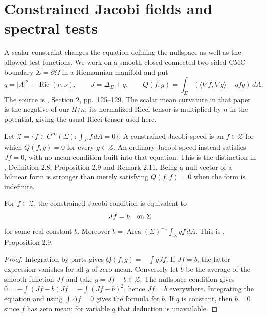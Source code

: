\chapter{Constrained Jacobi fields and spectral tests}\label{sec:cmc-jacobi}
A scalar constraint changes the equation defining the nullspace as well as the allowed test functions. We work on a smooth closed connected two-sided CMC boundary $\Sigma=\partial\Omega$ in a Riemannian manifold and put
\[
 q=|A|^2+\operatorname{Ric}(\nu,\nu),\qquad J=\Delta_\Sigma+q,\qquad
 Q(f,g)=\int_\Sigma(\langle\nabla f,\nabla g\rangle-qfg)\,dA.
\]
The source is \cite{BdCE88}, Section 2, pp.~125--129. The scalar mean curvature in that paper is the negative of our $H/n$; its normalized Ricci tensor is multiplied by $n$ in the potential, giving the usual Ricci tensor used here.

\begin{definition}\label{def:constrained-jacobi-nullspace}
Let $\mathcal Z=\{f\in C^\infty(\Sigma):\int_\Sigma f\,dA=0\}$. A constrained Jacobi speed is an $f\in\mathcal Z$ for which $Q(f,g)=0$ for every $g\in\mathcal Z$. An ordinary Jacobi speed instead satisfies $Jf=0$, with no mean condition built into that equation. This is the distinction in \cite{BdCE88}, Definition 2.8, Proposition 2.9 and Remark 2.11. Being a null vector of a bilinear form is stronger than merely satisfying $Q(f,f)=0$ when the form is indefinite.
\end{definition}

\begin{proposition}\label{prop:constrained-jacobi-constant}
For $f\in\mathcal Z$, the constrained Jacobi condition is equivalent to
\[
 Jf=b\quad\hbox{on }\Sigma
\]
for some real constant $b$. Moreover $b=\operatorname{Area}(\Sigma)^{-1}\int_\Sigma qf\,dA$. This is \cite{BdCE88}, Proposition 2.9.
\end{proposition}
\begin{proof}
Integration by parts gives $Q(f,g)=-\int gJf$. If $Jf=b$, the latter expression vanishes for all $g$ of zero mean. Conversely let $b$ be the average of the smooth function $Jf$ and take $g=Jf-b\in\mathcal Z$. The nullspace condition gives
$0=-\int(Jf-b)Jf=-\int(Jf-b)^2$, hence $Jf=b$ everywhere. Integrating the equation and using $\int\Delta f=0$ gives the formula for $b$. If $q$ is constant, then $b=0$ since $f$ has zero mean; for variable $q$ that deduction is unavailable.
\end{proof}

